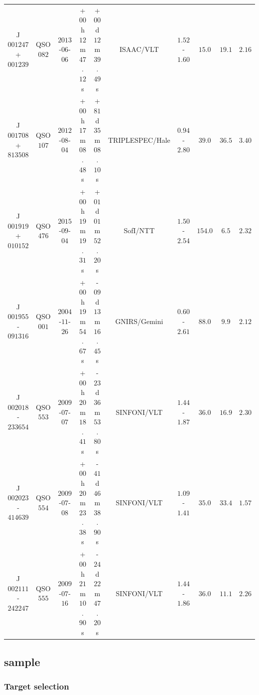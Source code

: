 \begin{landscape}
\begin{minipage}{\linewidth}
\begin{tabular}{cccccccccc}
    J$001247$+$001239$  &  QSO$082$ & $2013$-$06$-$06$ &  +$00$h$12$m$47$.$12$s &  +$00$d$12$m$39$.$49$s &        ISAAC/VLT &  $1.52$-$1.60$ &      $15.0$ &  $19.1$ &  $2.16$ \\
    J$001708$+$813508$  &  QSO$107$ & $2012$-$08$-$04$ &  +$00$h$17$m$08$.$48$s &  +$81$d$35$m$08$.$10$s &  TRIPLESPEC/Hale &  $0.94$-$2.80$ &      $39.0$ &  $36.5$ &  $3.40$ \\
    J$001919$+$010152$  &  QSO$476$ & $2015$-$09$-$04$ &  +$00$h$19$m$19$.$31$s &  +$01$d$01$m$52$.$20$s &         SofI/NTT &  $1.50$-$2.54$ &     $154.0$ &   $6.5$ &  $2.32$ \\
    J$001955$-$091316$  &  QSO$001$ & $2004$-$11$-$26$ &  +$00$h$19$m$54$.$67$s &  -$09$d$13$m$16$.$45$s &     GNIRS/Gemini &  $0.60$-$2.61$ &      $88.0$ &   $9.9$ &  $2.12$ \\
    J$002018$-$233654$  &  QSO$553$ & $2009$-$07$-$07$ &  +$00$h$20$m$18$.$41$s &  -$23$d$36$m$53$.$80$s &      SINFONI/VLT &  $1.44$-$1.87$ &      $36.0$ &  $16.9$ &  $2.30$ \\
    J$002023$-$414639$  &  QSO$554$ & $2009$-$07$-$08$ &  +$00$h$20$m$23$.$38$s &  -$41$d$46$m$38$.$90$s &      SINFONI/VLT &  $1.09$-$1.41$ &      $35.0$ &  $33.4$ &  $1.57$ \\
    J$002111$-$242247$  &  QSO$555$ & $2009$-$07$-$16$ &  +$00$h$21$m$10$.$90$s &  -$24$d$22$m$47$.$20$s &      SINFONI/VLT &  $1.44$-$1.86$ &      $36.0$ &  $11.1$ &  $2.26$ \\
    \bottomrule
    \end{tabular}
    \end{minipage}
\end{landscape}

\subsection{\citet{coatman16} sample}

\subsubsection{Target selection}

